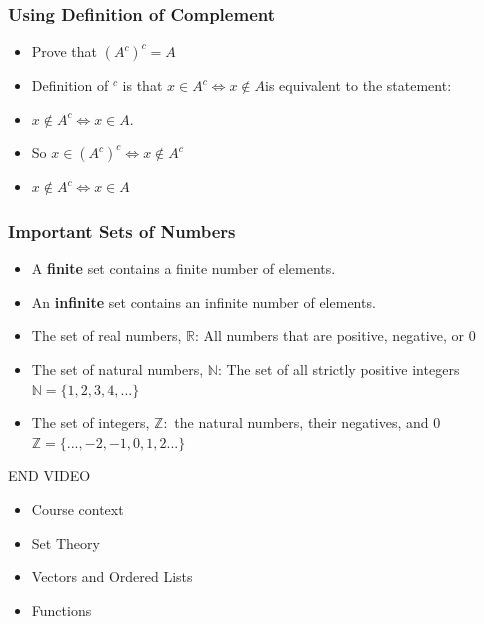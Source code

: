\documentclass[aspectratio=169]{beamer}
\numberwithin{equation}{section}
\begin{document}
\begin{frame}
\frametitle{Using Definition of Complement}

\begin{itemize}
\item Prove that $(A^c)^c=A$\pause
\item[1)] Definition of $^c$ is that $x \in A^c \iff x\notin A$\pause is equivalent to the statement:
\item[] $x \notin A^c \iff x\in A$.\pause
\item[2)] So $x \in (A^c)^c \iff x\notin  A^c$ \pause
\item $x \notin A^c \iff x\in A$

\end{itemize}
\end{frame}


\begin{frame}
\frametitle{Important Sets of Numbers}

\begin{itemize}
\item A \textbf{finite} set contains a finite number of elements. \pause

\item An \textbf{infinite} set contains an infinite number of elements.

\item The set of real numbers, $\mathbb{R}$: All numbers that are positive, negative, or 0 \pause

\item The set of natural numbers, $\mathbb{N}$: The set of all strictly positive integers \\$\mathbb{N}=\{1, 2, 3, 4, ...\}$ \pause

\item The set of integers, $\mathbb{Z}: $ the natural numbers, their negatives, and 0\\$\mathbb{Z}=\{..., -2, -1, 0, 1, 2 ...\}$
\end{itemize}

\end{frame}



\begin{frame}

END VIDEO

\end{frame}


\begin{frame}

\begin{itemize}
\item \textcolor{mygray}{Course context}
\item \textcolor{mygray}{Set Theory}
\item \textcolor{myblack}{Vectors and Ordered Lists}
\item \textcolor{mygray}{Functions}
\end{itemize}

\end{frame}
\end{document}
